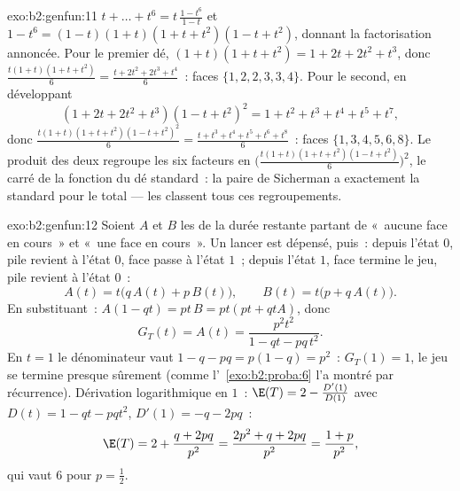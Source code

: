 \begin{solution}{exo:b2:genfun:11}
$t + \dots + t^6 = t\,\frac{1 - t^6}{1 - t}$ et $1 - t^6 =
(1 - t)(1 + t)(1 + t + t^2)(1 - t + t^2)$, donnant la
factorisation annoncée. Pour le premier dé, $(1 + t)(1 + t + t^2) = 1 +
2t + 2t^2 + t^3$, donc $\frac{t(1+t)(1+t+t^2)}6 = \frac{t +
2t^2 + 2t^3 + t^4}6$~: faces $\{1, 2, 2, 3, 3, 4\}$. Pour le
second, en développant
\[
(1 + 2t + 2t^2 + t^3)(1 - t + t^2)^2 = 1 + t^2 + t^3 + t^4 +
t^5 + t^7,
\]
donc $\frac{t(1+t)(1+t+t^2)(1-t+t^2)^2}6 = \frac{t + t^3 + t^4
+ t^5 + t^6 + t^8}6$~: faces $\{1, 3, 4, 5, 6, 8\}$. Le
produit des deux  regroupe les six
facteurs en $\bigl(\frac{t(1+t)(1+t+t^2)(1-t+t^2)}6
\bigr)^2$, le carré de la fonction du dé standard~: la
paire de Sicherman a exactement la  standard pour le total ---
les  classent tous ces regroupements.
\end{solution}

\begin{solution}{exo:b2:genfun:12}
Soient $A$ et $B$ les  de la durée restante
partant de «~aucune face en cours~» et «~une face en cours~». Un
lancer est dépensé, puis~: depuis l'état $0$, pile revient à l'état
$0$, face passe à l'état $1$~; depuis l'état
$1$, face termine le jeu, pile revient à l'état $0$~:
\[
A(t) = t\bigl(q\,A(t) + p\,B(t)\bigr),
\qquad
B(t) = t\bigl(p + q\,A(t)\bigr).
\]
En substituant~: $A(1 - qt) = pt\,B = pt(pt + qtA)$, donc
\[
G_T(t) = A(t) = \frac{p^2t^2}{1 - qt - pq\,t^2} .
\]
En $t = 1$ le dénominateur vaut $1 - q - pq = p(1 - q) = p^2$~:
$G_T(1) = 1$, le jeu se termine presque sûrement (comme
l'~\cref{exo:b2:proba:6} l'a montré par récurrence). Dérivation
logarithmique en $1$~: $\E(T) = 2 - \frac{D'(1)}{D(1)}$ avec
$D(t) = 1 - qt - pqt^2$, $D'(1) = -q - 2pq$~:
\[
\E(T) = 2 + \frac{q + 2pq}{p^2} = \frac{2p^2 + q + 2pq}{p^2}
= \frac{1 + p}{p^2},
\]
qui vaut $6$ pour $p = \frac12$.
\end{solution}

